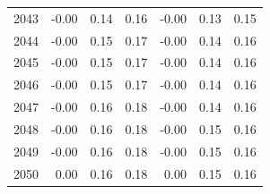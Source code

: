 \begin{table}
\begin{tabular}{lrrrrrr}
2043 & -0.00 & 0.14 & 0.16 & -0.00 & 0.13 & 0.15 \\
2044 & -0.00 & 0.15 & 0.17 & -0.00 & 0.14 & 0.16 \\
2045 & -0.00 & 0.15 & 0.17 & -0.00 & 0.14 & 0.16 \\
2046 & -0.00 & 0.15 & 0.17 & -0.00 & 0.14 & 0.16 \\
2047 & -0.00 & 0.16 & 0.18 & -0.00 & 0.14 & 0.16 \\
2048 & -0.00 & 0.16 & 0.18 & -0.00 & 0.15 & 0.16 \\
2049 & -0.00 & 0.16 & 0.18 & -0.00 & 0.15 & 0.16 \\
2050 & 0.00 & 0.16 & 0.18 & 0.00 & 0.15 & 0.16 \\
\bottomrule
\end{tabular}
\end{table}
